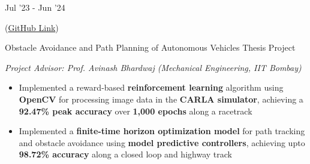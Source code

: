 \documentclass[9pt]{developercv}
\begin{document}
\vspace{-15 pt}
\vspace{-2.5pt}

\begin{entrylist}
	\entry
        {Jul '23 - Jun '24 \newline\newline \vspace{-15pt}
        
        (\href{https://github.com/omprabhu31/mpc_self_driving_cars}{GitHub Link})}
		{Obstacle Avoidance and Path Planning of Autonomous Vehicles}
		{Thesis Project}
            {\vspace{-9.5pt}
            
            \textit{Project Advisor: Prof. Avinash Bhardwaj (Mechanical Engineering, IIT Bombay)}
            {\vspace{2pt}
        \begin{itemize}[noitemsep, topsep=0pt, parsep=0pt, partopsep=0pt, leftmargin=9pt] 
            \item Implemented a reward-based \textbf{reinforcement learning} algorithm using \textbf{OpenCV} for processing image data in the \textbf{CARLA simulator}, achieving a \textbf{92.47\% peak accuracy} over \textbf{1,000 epochs} along a racetrack
            \vspace{1.5pt}
            
            \item Implemented a \textbf{finite-time horizon optimization model} for path tracking and obstacle avoidance using \textbf{model predictive controllers}, achieving upto \textbf{98.72\% accuracy} along a closed loop and highway track
        \end{itemize}}}
\end{entrylist}

\vspace{-15 pt}
\vspace{-2.5pt}
\end{document}
